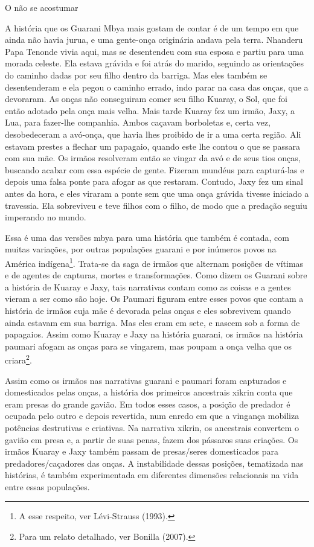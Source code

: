 \documentclass{article}
\begin{document}
O n\~ao se acostumar

A hist\'oria que os Guarani Mbya mais gostam de contar \'e de um tempo
em que ainda n\~ao havia jurua, e uma gente-on\c{c}a origin\'aria
andava pela terra. Nhanderu Papa Tenonde vivia aqui, mas se desentendeu
com sua esposa e partiu para uma morada celeste. Ela estava gr\'avida e
foi atr\'as do marido, seguindo as orienta\c{c}\~oes do caminho dadas
por seu filho dentro da barriga. Mas eles tamb\'em se desentenderam e
ela pegou o caminho errado, indo parar na casa das on\c{c}as, que a
devoraram. As on\c{c}as n\~ao conseguiram comer seu filho Kuaray, o
Sol, que foi ent\~ao adotado pela on\c{c}a mais velha. Mais tarde
Kuaray fez um irm\~ao, Jaxy, a Lua, para fazer-lhe companhia. Ambos
ca\c{c}avam borboletas e, certa vez, desobedeceram a av\'o-on\c{c}a,
que havia lhes proibido de ir a uma certa regi\~ao. Ali estavam prestes
a flechar um papagaio, quando este lhe contou o que se passara com sua
m\~ae. Os irm\~aos resolveram ent\~ao se vingar da av\'o e de seus tios
on\c{c}as, buscando acabar com essa esp\'ecie de gente. Fizeram
mund\'eus para captur\'a-las e depois uma falsa ponte para afogar as
que restaram. Contudo, Jaxy fez um sinal antes da hora, e eles viraram
a ponte sem que uma on\c{c}a gr\'avida tivesse iniciado a travessia.
Ela sobreviveu e teve filhos com o filho, de modo que a preda\c{c}\~ao
seguiu imperando no mundo.

Essa \'e uma das vers\~oes mbya para uma hist\'oria que tamb\'em \'e
contada, com muitas varia\c{c}\~oes, por outras popula\c{c}\~oes
guarani e por in\'umeros povos na Am\'erica ind\'igena\footnote{ A esse
respeito, ver L\'evi-Strauss (1993).}. Trata-se da saga de irm\~aos que
alternam posi\c{c}\~oes de v\'itimas e de agentes de capturas, mortes e
transforma\c{c}\~oes. Como dizem os Guarani sobre a hist\'oria de
Kuaray e Jaxy, tais narrativas contam como as coisas e a gentes vieram
a ser como s\~ao hoje. Os Paumari figuram entre esses povos que contam
a hist\'oria de irm\~aos cuja m\~ae \'e devorada pelas on\c{c}as e eles
sobrevivem quando ainda estavam em sua barriga. Mas eles eram em sete,
e nascem sob a forma de papagaios. Assim como Kuaray e Jaxy na
hist\'oria guarani, os irm\~aos na hist\'oria paumari afogam as
on\c{c}as para se vingarem, mas poupam a on\c{c}a velha que os
criara\footnote{ Para um relato detalhado, ver Bonilla (2007).}.

Assim como os irm\~aos nas narrativas guarani e paumari foram capturados
e domesticados pelas on\c{c}as, a hist\'oria dos primeiros ancestrais
xikrin conta que eram presas do grande gavi\~ao. Em todos esses casos,
a posi\c{c}\~ao de predador \'e ocupada pelo outro e depois revertida,
num enredo em que a vingan\c{c}a mobiliza pot\^encias destrutivas e
criativas. Na narrativa xikrin, os ancestrais convertem o gavi\~ao em
presa e, a partir de suas penas, fazem dos p\'assaros suas
cria\c{c}\~oes. Os irm\~aos Kuaray e Jaxy tamb\'em passam de
presas/seres domesticados para predadores/ca\c{c}adores das on\c{c}as.
A instabilidade dessas posi\c{c}\~oes, tematizada nas hist\'orias, \'e
tamb\'em experimentada em diferentes dimens\~oes relacionais na vida
entre essas popula\c{c}\~oes. 
\end{document}
